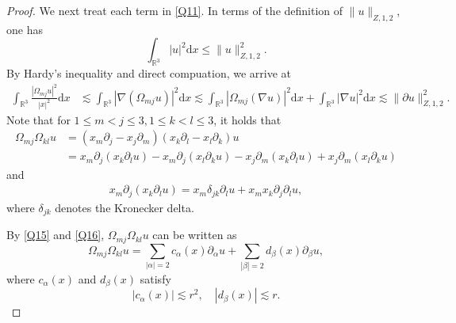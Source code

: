 \documentclass[11pt,twoside]{article}
\newcommand{\R}{\mathbb R}
\newcommand{\p}{\partial}
\newcommand{\f}{\frac}
\newcommand{\al}{\alpha}
\theoremstyle{plain}
\theoremstyle{definition}
\theoremstyle{remark}
\numberwithin{equation}{section}
\begin{document}
\begin{proof}
We next treat each term in \eqref{Q11}. In terms of the definition of $\|u\|_{Z, 1, 2}$, one has
\begin{equation}\label{Q12}
\int_{\R^3}|u|^2\mathrm{d}x \leq \|u\|^2_{Z, 1, 2}.
\end{equation}
By Hardy's inequality and direct compuation, we arrive at
\begin{equation}\label{Q13}
\begin{aligned}
\int_{\R^3}\f{|\Omega_{mj}u|^2}{|x|^2}\mathrm{d}x&\lesssim \int_{\R^3}|\nabla(\Omega_{mj} u)|^2\mathrm{d} x
\lesssim \int_{\R^3}|\Omega_{mj}(\nabla u)|^2\mathrm{d} x+\int_{\R^3}|\nabla u|^2\mathrm{d} x
\lesssim \|\p u\|^2_{Z, 1, 2}.
\end{aligned}
\end{equation}
Note that for $1\leq m<j\leq3, 1\leq k<l\leq3$, it holds that
\begin{equation}\label{Q15}
\begin{aligned}
\Omega_{mj}\Omega_{kl}u&=(x_m\p_j-x_j\p_m)(x_k\p_l-x_l\p_k)u\\
&=x_m\p_j(x_k\p_lu)-x_m\p_j(x_l\p_ku)-x_j\p_m(x_k\p_lu)
+x_j\p_m(x_l\p_ku)
\end{aligned}
\end{equation}
and
\begin{equation}\label{Q16}
\begin{aligned}
x_m\p_j(x_k\p_lu)=x_m\delta_{jk}\p_lu+x_mx_k\p_j\p_lu,
\end{aligned}
\end{equation}
where  $\delta_{jk}$ denotes the Kronecker delta.

By \eqref{Q15} and \eqref{Q16}, $\Omega_{mj}\Omega_{kl}u$ can be written as
\begin{equation}\label{Q17}
\Omega_{mj}\Omega_{kl}u=\sum_{|\al|=2}c_\al(x)\p_{\al}u+\sum_{|\beta|=2}d_\beta(x)\p_{\beta}u,
\end{equation}
where $c_\al(x)$ and $d_\beta(x)$ satisfy
\begin{equation}\label{Q18}
|c_\al(x)|\lesssim r^2, \quad |d_\beta(x)|\lesssim r.
\end{equation}


\end{proof}
\end{document}
